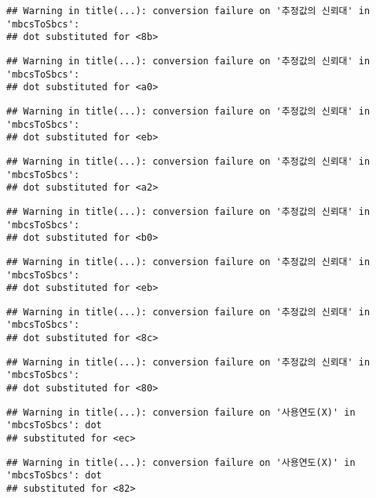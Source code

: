 \documentclass[
]{article}
\begin{document}
\begin{verbatim}
## Warning in title(...): conversion failure on '추정값의 신뢰대' in 'mbcsToSbcs':
## dot substituted for <8b>
\end{verbatim}

\begin{verbatim}
## Warning in title(...): conversion failure on '추정값의 신뢰대' in 'mbcsToSbcs':
## dot substituted for <a0>
\end{verbatim}

\begin{verbatim}
## Warning in title(...): conversion failure on '추정값의 신뢰대' in 'mbcsToSbcs':
## dot substituted for <eb>
\end{verbatim}

\begin{verbatim}
## Warning in title(...): conversion failure on '추정값의 신뢰대' in 'mbcsToSbcs':
## dot substituted for <a2>
\end{verbatim}

\begin{verbatim}
## Warning in title(...): conversion failure on '추정값의 신뢰대' in 'mbcsToSbcs':
## dot substituted for <b0>
\end{verbatim}

\begin{verbatim}
## Warning in title(...): conversion failure on '추정값의 신뢰대' in 'mbcsToSbcs':
## dot substituted for <eb>
\end{verbatim}

\begin{verbatim}
## Warning in title(...): conversion failure on '추정값의 신뢰대' in 'mbcsToSbcs':
## dot substituted for <8c>
\end{verbatim}

\begin{verbatim}
## Warning in title(...): conversion failure on '추정값의 신뢰대' in 'mbcsToSbcs':
## dot substituted for <80>
\end{verbatim}

\begin{verbatim}
## Warning in title(...): conversion failure on '사용연도(X)' in 'mbcsToSbcs': dot
## substituted for <ec>
\end{verbatim}

\begin{verbatim}
## Warning in title(...): conversion failure on '사용연도(X)' in 'mbcsToSbcs': dot
## substituted for <82>
\end{verbatim}
\end{document}
